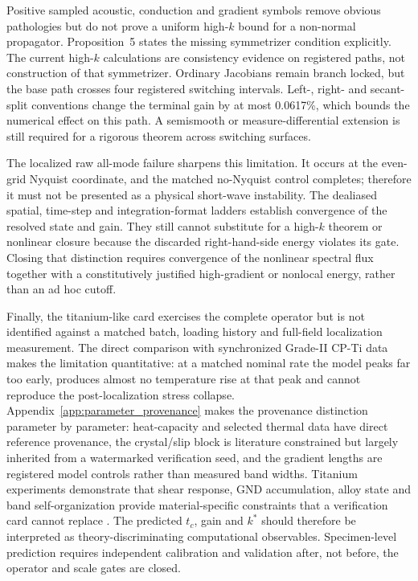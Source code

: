 Positive sampled acoustic, conduction and gradient symbols remove obvious pathologies but do not prove a uniform high-$k$ bound for a non-normal propagator. Proposition~5 states the missing symmetrizer condition explicitly. The current high-$k$ calculations are consistency evidence on registered paths, not construction of that symmetrizer. Ordinary Jacobians remain branch locked, but the base path crosses four registered switching intervals. Left-, right- and secant-split conventions change the terminal gain by at most 0.0617\%, which bounds the numerical effect on this path. A semismooth or measure-differential extension is still required for a rigorous theorem across switching surfaces.

The localized raw all-mode failure sharpens this limitation. It occurs at the
even-grid Nyquist coordinate, and the matched no-Nyquist control completes;
therefore it must not be presented as a physical short-wave instability. The
dealiased spatial, time-step and integration-format ladders establish
convergence of the resolved state and gain. They still cannot substitute for
a high-$k$ theorem or nonlinear closure because the discarded right-hand-side
energy violates its gate. Closing that distinction requires convergence of
the nonlinear spectral flux together with a constitutively justified
high-gradient or nonlocal energy, rather than an ad hoc cutoff.

Finally, the titanium-like card exercises the complete operator but is not identified against a matched batch, loading history and full-field localization measurement. The direct comparison with synchronized Grade-II CP-Ti data makes the limitation quantitative: at a matched nominal rate the model peaks far too early, produces almost no temperature rise at that peak and cannot reproduce the post-localization stress collapse. Appendix~\ref{app:parameter_provenance} makes the provenance distinction parameter by parameter: heat-capacity and selected thermal data have direct reference provenance, the crystal/slip block is literature constrained but largely inherited from a watermarked verification seed, and the gradient lengths are registered model controls rather than measured band widths. Titanium experiments demonstrate that shear response, GND accumulation, alloy state and band self-organization provide material-specific constraints that a verification card cannot replace \cite{GuoEtAl2019PRL,ZhuEtAl2017,RanEtAl2021,XueMeyersNesterenko2002}. The predicted $t_c$, gain and $k^*$ should therefore be interpreted as theory-discriminating computational observables. Specimen-level prediction requires independent calibration and validation after, not before, the operator and scale gates are closed.
